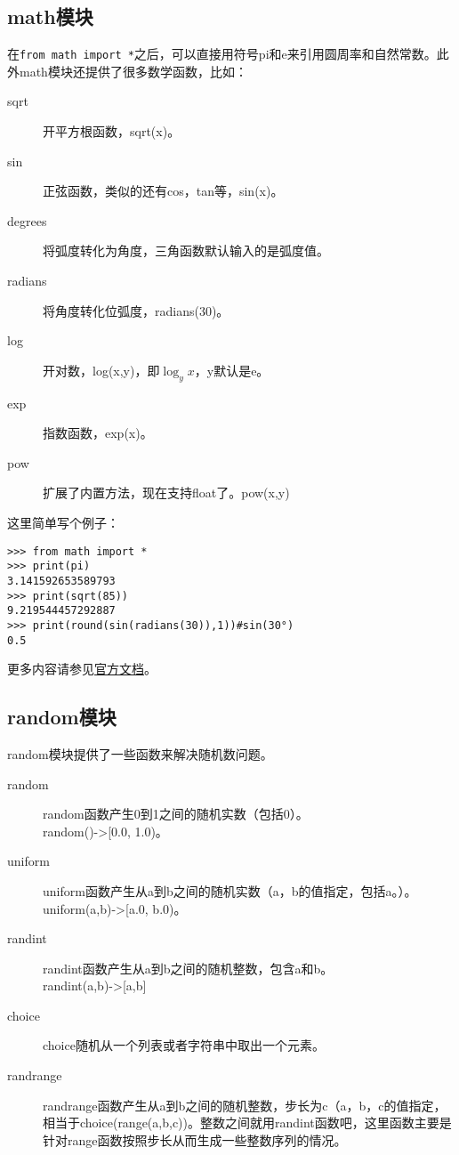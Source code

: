 \documentclass[12pt,oneside]{book}
\begin{document}
\begin{common-format}
\subsection{math模块}
在\verb+from math import *+之后，可以直接用符号pi和e来引用圆周率和自然常数。此外math模块还提供了很多数学函数，比如：
\begin{description}
\item[sqrt] 开平方根函数，sqrt(x)。
\item[sin] 正弦函数，类似的还有cos，tan等，sin(x)。
\item[degrees] 将弧度转化为角度，三角函数默认输入的是弧度值。
\item[radians] 将角度转化位弧度，radians(30)。 
\item[log] 开对数，log(x,y)，即$\log_y x$，y默认是e。
\item[exp] 指数函数，exp(x)。
\item[pow] 扩展了内置方法，现在支持float了。pow(x,y)
\end{description}

这里简单写个例子：
\begin{Verbatim}
>>> from math import *
>>> print(pi)
3.141592653589793
>>> print(sqrt(85))
9.219544457292887
>>> print(round(sin(radians(30)),1))#sin(30°)
0.5
\end{Verbatim}

\begin{large}
更多内容请参见\href{http://docs.python.org/3.4/library/math.html}{官方文档}。
\end{large}



\subsection{random模块}
random模块提供了一些函数来解决随机数问题。
\begin{description}
\item[random] random函数产生0到1之间的随机实数（包括0）。\\ random()->[0.0, 1.0)。
\item[uniform] uniform函数产生从a到b之间的随机实数（a，b的值指定，包括a。）。\\ uniform(a,b)->[a.0, b.0)。
\item[randint] randint函数产生从a到b之间的随机整数，包含a和b。\\ randint(a,b)->[a,b]
\item[choice] choice随机从一个列表或者字符串中取出一个元素。
\item[randrange] randrange函数产生从a到b之间的随机整数，步长为c（a，b，c的值指定，相当于choice(range(a,b,c))。整数之间就用randint函数吧，这里函数主要是针对range函数按照步长从而生成一些整数序列的情况。
\end{description}


\end{common-format}
\end{document}
